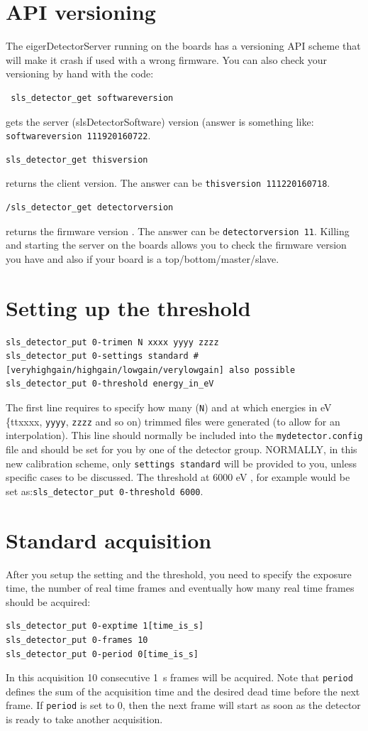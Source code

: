 \documentclass{article}
\begin{document}
\section{API versioning}
The eigerDetectorServer running on the boards has a versioning API scheme that will make it crash if used with a wrong firmware.
You can also check your versioning by hand with the code:
\begin{verbatim}
 sls_detector_get softwareversion
\end{verbatim}
gets the server (slsDetectorSoftware) version (answer is something like: {\tt{softwareversion 111920160722}}.
 \begin{verbatim}
sls_detector_get thisversion 
\end{verbatim}
returns the client version. The answer can be {\tt{thisversion 111220160718}}.
\begin{verbatim}
/sls_detector_get detectorversion
\end{verbatim}
returns the firmware version . The answer can be {\tt{detectorversion 11}}.
Killing and starting the server on the boards allows you to check the firmware version you have and also if your board is a top/bottom/master/slave.

\section{Setting up the threshold}
\begin{verbatim}
sls_detector_put 0-trimen N xxxx yyyy zzzz
sls_detector_put 0-settings standard #[veryhighgain/highgain/lowgain/verylowgain] also possible
sls_detector_put 0-threshold energy_in_eV
\end{verbatim}
The first line requires to specify how many ({\tt{N}}) and at which energies in eV {\{tt{xxxx}}, {\tt{yyyy}}, {\tt{zzzz}} and so on) trimmed files were generated (to allow for an interpolation). This line should normally be included into the {\tt{mydetector.config}} file and should be set for you by one of the detector group.
NORMALLY, in this new calibration scheme, only {\tt{settings standard}} will be provided to you, unless specific cases to be discussed.
The threshold at 6000 eV , for example would be set as:{\tt{sls\_detector\_put 0-threshold 6000}}.

\section{Standard acquisition}

After you setup the setting and the threshold, you need to specify the exposure time, the number of real time frames and eventually how many real time frames should be acquired:
\begin{verbatim}
sls_detector_put 0-exptime 1[time_is_s]
sls_detector_put 0-frames 10
sls_detector_put 0-period 0[time_is_s]
\end{verbatim}
In this acquisition 10 consecutive 1~s frames will be acquired. Note that {\tt{period}} defines the sum of the acquisition time and the desired dead time before the next frame. If {\tt{period}} is set to 0, then the next frame will start as soon as the detector is ready to take another acquisition. \\
\end{document}
